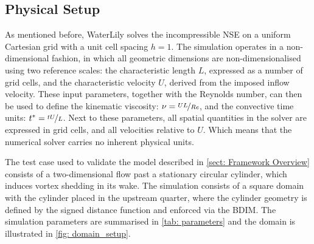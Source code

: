 \subsection{Physical Setup}
As mentioned before, WaterLily solves the incompressible NSE on a uniform Cartesian grid with a unit cell spacing $h=1$. The simulation operates in a non-dimensional fashion, in which all geometric dimensions are non-dimensionalised using two reference scales: the characteristic length $L$, expressed as a number of grid cells, and the characteristic velocity $U$, derived from the imposed inflow velocity. These input parameters, together with the Reynolds number, can then be used to define the kinematic viscosity: $\nu=\nicefrac{UL}{Re}$, and the convective time units: $t^*=\nicefrac{tU}{L}$. Next to these parameters, all spatial quantities in the solver are expressed in grid cells, and all velocities relative to $U$. Which means that the numerical solver carries no inherent physical units. 


The test case used to validate the model described in \autoref{sect: Framework Overview} consists of a two-dimensional flow past a stationary circular cylinder, which induces vortex shedding in its wake. The simulation consists of a square domain with the cylinder placed in the upstream quarter, where the cylinder geometry is defined by the signed distance function and enforced via the BDIM. The simulation parameters are summarised in \autoref{tab: parameters} and the domain is illustrated in \autoref{fig: domain_setup}.


